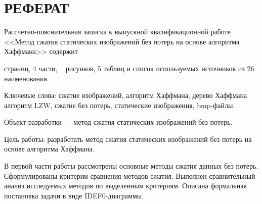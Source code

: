 \chapter*{РЕФЕРАТ}






Рассчетно-пояснительная записка к выпускной квалификационной работе <<Метод сжатия статических изображений без потерь на основе алгоритма Хаффмана>> содержит \begin{NoHyper}\pageref{LastPage}\end{NoHyper} страниц, 4 части, \totfig~ рисунков, 5 таблиц и список используемых источников из 26 наименования. 

Ключевые слова: сжатие изображений, алгоритм Хаффмана, дерево Хаффмана алгоритм LZW, сжатие без потерь, статические изображения, bmp-файлы.

Объект разработки --- метод сжатия статических изображений без потерь.

Цель работы: разработать метод сжатия статических изображений без потерь на основе алгоритма Хаффмана.

В первой части работы рассмотрены основные методы сжатия данных без потерь. Сформулированы критерии сравнения методов сжатия. Выполнен сравнительный анализ исследуемых методов по выделенным критериям. Описана формальная постановка задачи в виде IDEF0-диаграммы.

